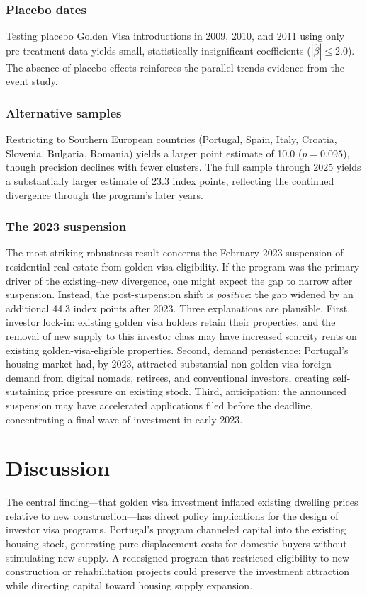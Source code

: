 \documentclass[12pt]{article}
\begin{document}
\subsubsection*{Placebo dates} Testing placebo Golden Visa introductions in 2009, 2010, and 2011 using only pre-treatment data yields small, statistically insignificant coefficients ($|\hat{\beta}| \leq 2.0$). The absence of placebo effects reinforces the parallel trends evidence from the event study.

\subsubsection*{Alternative samples} Restricting to Southern European countries (Portugal, Spain, Italy, Croatia, Slovenia, Bulgaria, Romania) yields a larger point estimate of 10.0 ($p = 0.095$), though precision declines with fewer clusters. The full sample through 2025 yields a substantially larger estimate of 23.3 index points, reflecting the continued divergence through the program's later years.

\subsubsection*{The 2023 suspension} The most striking robustness result concerns the February 2023 suspension of residential real estate from golden visa eligibility. If the program was the primary driver of the existing--new divergence, one might expect the gap to narrow after suspension. Instead, the post-suspension shift is \textit{positive}: the gap widened by an additional 44.3 index points after 2023. Three explanations are plausible. First, investor lock-in: existing golden visa holders retain their properties, and the removal of new supply to this investor class may have increased scarcity rents on existing golden-visa-eligible properties. Second, demand persistence: Portugal's housing market had, by 2023, attracted substantial non-golden-visa foreign demand from digital nomads, retirees, and conventional investors, creating self-sustaining price pressure on existing stock. Third, anticipation: the announced suspension may have accelerated applications filed before the deadline, concentrating a final wave of investment in early 2023.

\section{Discussion}

The central finding---that golden visa investment inflated existing dwelling prices relative to new construction---has direct policy implications for the design of investor visa programs. Portugal's program channeled capital into the existing housing stock, generating pure displacement costs for domestic buyers without stimulating new supply. A redesigned program that restricted eligibility to new construction or rehabilitation projects could preserve the investment attraction while directing capital toward housing supply expansion.
\end{document}
